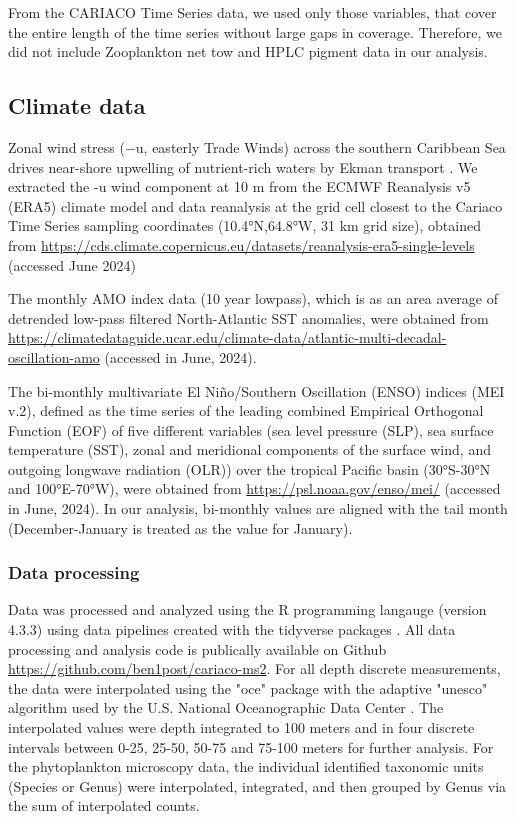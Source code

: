 \documentclass[draft]{agujournal2019}
\begin{document}
    From the CARIACO Time Series data, we used only those variables, that cover the entire length of the time series without large gaps in coverage. Therefore, we did not include Zooplankton net tow and HPLC pigment data in our analysis. 


\subsection{Climate data}
    Zonal wind stress (−u, easterly Trade Winds) across the southern Caribbean Sea drives near-shore upwelling of nutrient-rich waters by Ekman transport \cite{taylor_ecosystem_2012}. We extracted the -u wind component at 10 m from the ECMWF Reanalysis v5 (ERA5) climate model and data reanalysis at the grid cell closest to the Cariaco Time Series sampling coordinates (10.4°N,64.8°W, 31 km grid size), obtained from \url{https://cds.climate.copernicus.eu/datasets/reanalysis-era5-single-levels} (accessed June 2024)
    
    The monthly AMO index data (10 year lowpass), which is as an area average of detrended low-pass filtered North-Atlantic SST anomalies, were obtained from \url{https://climatedataguide.ucar.edu/climate-data/atlantic-multi-decadal-oscillation-amo} (accessed in June, 2024).
    
    The bi-monthly multivariate El Niño/Southern Oscillation (ENSO) indices (MEI v.2), defined as the time series of the leading combined Empirical Orthogonal Function (EOF) of five different variables (sea level pressure (SLP), sea surface temperature (SST), zonal and meridional components of the surface wind, and outgoing longwave radiation (OLR)) over the tropical Pacific basin (30°S-30°N and 100°E-70°W), were obtained from \url{https://psl.noaa.gov/enso/mei/} (accessed in June, 2024). In our analysis, bi-monthly values are aligned with the tail month (December-January is treated as the value for January).
    

    \subsubsection{Data processing}
    Data was processed and analyzed using the R programming langauge (version 4.3.3) \cite{r_core_team_r_2024} using data pipelines created with the tidyverse packages \cite{wickham_welcome_2019}. All data processing and analysis code is publically available on Github \url{https://github.com/ben1post/cariaco-ms2}. %
    For all depth discrete measurements, the data were interpolated using the "oce" package \cite{kelley_oce_2023} with the adaptive "unesco" algorithm used by the U.S. National Oceanographic Data Center \cite{johnson2006world}. The interpolated values were depth integrated to 100 meters and in four discrete intervals between 0-25, 25-50, 50-75 and 75-100 meters for further analysis. For the phytoplankton microscopy data, the individual identified taxonomic units (Species or Genus) were interpolated, integrated, and then grouped by Genus via the sum of interpolated counts.
\end{document}
